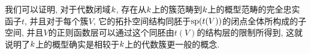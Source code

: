 我们可以证明, 对于代数闭域$\kk$, 存在从$\kk$上的簇范畴到$\kk$上的概型范畴的完全忠实函子$t$, 并且对于每个簇$V$, 它的拓扑空间结构同胚于$\sp (t(V))$的闭点全体所构成的子空间, 并且$V$的正则函数层可以通过这个同胚由$t(V)$的结构层的限制所得到, 这就说明了$\kk$上的概型确实是相较于$\kk$上的代数簇更一般的概念.


